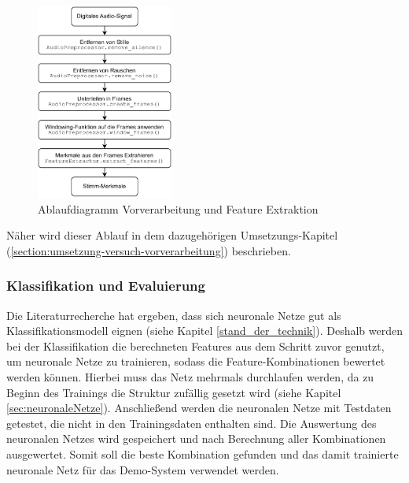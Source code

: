 \begin{figure}[H]
    \centering
    \includegraphics[width=0.4\textwidth, keepaspectratio]{images/ablaufdiagramm-preprocessing-extraction.pdf}
    \caption{Ablaufdiagramm Vorverarbeitung und Feature Extraktion}
    \label{fig:ablaufdiagramm-preprocessing-extraction}
\end{figure}\noindent

Näher wird dieser Ablauf in dem dazugehörigen Umsetzungs-Kapitel (\ref{section:umsetzung-versuch-vorverarbeitung}) beschrieben.

\subsubsection{Klassifikation und Evaluierung}\label{sec:KonzeptKlassifikation}

Die Literaturrecherche hat ergeben, dass sich neuronale Netze gut als Klassifikationsmodell eignen (siehe Kapitel \ref{stand_der_technik}). 
Deshalb werden bei der Klassifikation die berechneten Features aus dem Schritt zuvor genutzt, um neuronale Netze zu trainieren, sodass die Feature-Kombinationen bewertet werden können.
Hierbei muss das Netz mehrmals durchlaufen werden, da zu Beginn des Trainings die Struktur zufällig gesetzt wird (siehe Kapitel \ref{sec:neuronaleNetze}).
Anschließend werden die neuronalen Netze mit Testdaten getestet, die nicht in den Trainingsdaten enthalten sind.
Die Auswertung des neuronalen Netzes wird gespeichert und nach Berechnung aller Kombinationen ausgewertet.
Somit soll die beste Kombination gefunden und das damit trainierte neuronale Netz für das Demo-System verwendet werden.

